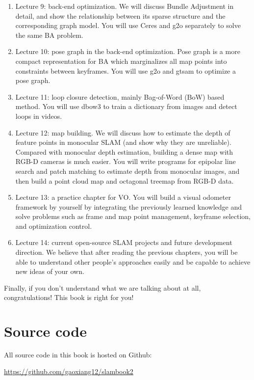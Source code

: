 \begin{enumerate}
	\item Lecture 9: back-end optimization. We will discuss Bundle Adjustment in detail, and show the relationship between its sparse structure and the corresponding graph model. You will use Ceres and g2o separately to solve the same BA problem.
	
	\item Lecture 10: pose graph in the back-end optimization. Pose graph is a more compact representation for BA which marginalizes all map points into constraints between keyframes. You will use g2o and gtsam to optimize a pose graph.
	
	\item Lecture 11: loop closure detection, mainly Bag-of-Word (BoW) based method. You will use dbow3 to train a dictionary from images and detect loops in videos. 
	
	\item Lecture 12: map building. We will discuss how to estimate the depth of feature points in monocular SLAM  (and show why they are unreliable). Compared with monocular depth estimation, building a dense map with RGB-D cameras is much easier. You will write programs for epipolar line search and patch matching to estimate depth from monocular images, and then build a point cloud map and octagonal treemap from RGB-D data.
	
	\item Lecture 13: a practice chapter for VO. You will build a visual odometer framework by yourself by integrating the previously learned knowledge and solve problems such as frame and map point management, keyframe selection, and optimization control.
	
	\item Lecture 14: current open-source SLAM projects and future development direction. We believe that after reading the previous chapters, you will be able to understand other people's approaches easily and be capable to achieve new ideas of your own.
\end{enumerate}

Finally, if you don't understand what we are talking about at all, congratulations! This book is right for you! 

\section{Source code}

All source code in this book is hosted on Github:

{\hfill\url{https://github.com/gaoxiang12/slambook2}\hfill}

